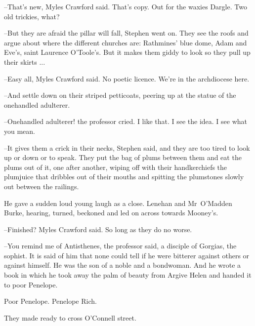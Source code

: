 
--That's new,
Myles Crawford said.
That's copy.
Out for the waxies Dargle.
Two old trickies, what?

--But they are afraid the pillar will fall,
Stephen went on.
They see the roofs and argue about where the different churches are:
Rathmines' blue dome,
Adam and Eve's,
saint Laurence O'Toole's.
But it makes them giddy to look
so they pull up their skirts ...



--Easy all,
Myles Crawford said.
No poetic licence.
We're in the archdiocese here.

--And settle down on their striped petticoats,
peering up at the statue of the onehandled adulterer.

--Onehandled adulterer!
the professor cried.
I like that.
I see the idea.
I see what you mean.



--It gives them a crick in their necks,
Stephen said,
and they are too tired to look up or down or to speak.
They put the bag of plums between them and eat the plums out of it,
one after another,
wiping off with their handkerchiefs the plumjuice
that dribbles out of their mouths
and spitting the plumstones slowly out between the railings.

He gave a sudden loud young laugh as a close.
Lenehan and Mr~O'Madden Burke,
hearing,
turned,
beckoned
and led on across towards Mooney's.

--Finished?
Myles Crawford said.
So long as they do no worse.



--You remind me of Antisthenes,
the professor said,
a disciple of Gorgias, the sophist.
It is said of him that none could tell
if he were bitterer against others or against himself.
He was the son of a noble and a bondwoman.
And he wrote a book
in which he took away the palm of beauty from Argive Helen
and handed it to poor Penelope.

Poor Penelope.
Penelope Rich.

They made ready to cross O'Connell street.


